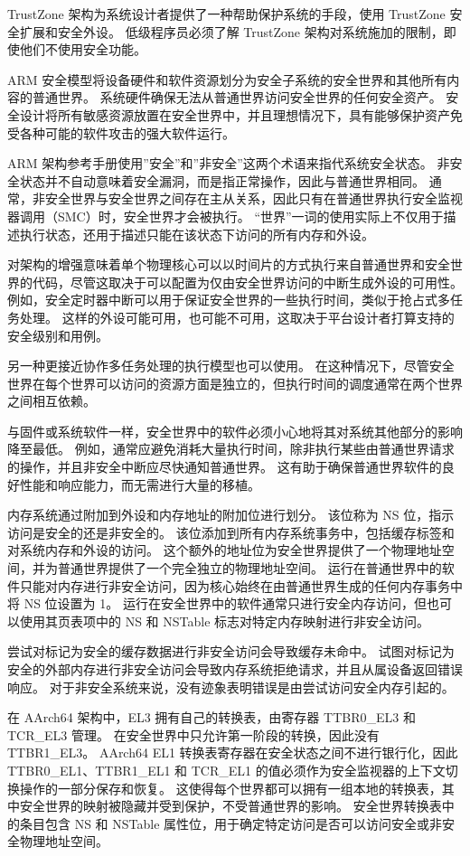 TrustZone 架构为系统设计者提供了一种帮助保护系统的手段，使用 TrustZone 安全扩展和安全外设。
低级程序员必须了解 TrustZone 架构对系统施加的限制，即使他们不使用安全功能。

ARM 安全模型将设备硬件和软件资源划分为安全子系统的安全世界和其他所有内容的普通世界。
系统硬件确保无法从普通世界访问安全世界的任何安全资产。
安全设计将所有敏感资源放置在安全世界中，并且理想情况下，具有能够保护资产免受各种可能的软件攻击的强大软件运行。

ARM 架构参考手册使用''安全''和''非安全''这两个术语来指代系统安全状态。
非安全状态并不自动意味着安全漏洞，而是指正常操作，因此与普通世界相同。
通常，非安全世界与安全世界之间存在主从关系，因此只有在普通世界执行安全监视器调用（SMC）时，安全世界才会被执行。
``世界''一词的使用实际上不仅用于描述执行状态，还用于描述只能在该状态下访问的所有内存和外设。

对架构的增强意味着单个物理核心可以以时间片的方式执行来自普通世界和安全世界的代码，尽管这取决于可以配置为仅由安全世界访问的中断生成外设的可用性。
例如，安全定时器中断可以用于保证安全世界的一些执行时间，类似于抢占式多任务处理。
这样的外设可能可用，也可能不可用，这取决于平台设计者打算支持的安全级别和用例。

另一种更接近协作多任务处理的执行模型也可以使用。
在这种情况下，尽管安全世界在每个世界可以访问的资源方面是独立的，但执行时间的调度通常在两个世界之间相互依赖。

与固件或系统软件一样，安全世界中的软件必须小心地将其对系统其他部分的影响降至最低。
例如，通常应避免消耗大量执行时间，除非执行某些由普通世界请求的操作，并且非安全中断应尽快通知普通世界。
这有助于确保普通世界软件的良好性能和响应能力，而无需进行大量的移植。

内存系统通过附加到外设和内存地址的附加位进行划分。
该位称为 NS 位，指示访问是安全的还是非安全的。
该位添加到所有内存系统事务中，包括缓存标签和对系统内存和外设的访问。
这个额外的地址位为安全世界提供了一个物理地址空间，并为普通世界提供了一个完全独立的物理地址空间。
运行在普通世界中的软件只能对内存进行非安全访问，因为核心始终在由普通世界生成的任何内存事务中将 NS 位设置为 1。
运行在安全世界中的软件通常只进行安全内存访问，但也可以使用其页表项中的 NS 和 NSTable 标志对特定内存映射进行非安全访问。

尝试对标记为安全的缓存数据进行非安全访问会导致缓存未命中。
试图对标记为安全的外部内存进行非安全访问会导致内存系统拒绝请求，并且从属设备返回错误响应。
对于非安全系统来说，没有迹象表明错误是由尝试访问安全内存引起的。

在 AArch64 架构中，EL3 拥有自己的转换表，由寄存器 TTBR0\_EL3 和 TCR\_EL3 管理。
在安全世界中只允许第一阶段的转换，因此没有 TTBR1\_EL3。
AArch64 EL1 转换表寄存器在安全状态之间不进行银行化，因此 TTBR0\_EL1、TTBR1\_EL1 和 TCR\_EL1 的值必须作为安全监视器的上下文切换操作的一部分保存和恢复。
这使得每个世界都可以拥有一组本地的转换表，其中安全世界的映射被隐藏并受到保护，不受普通世界的影响。
安全世界转换表中的条目包含 NS 和 NSTable 属性位，用于确定特定访问是否可以访问安全或非安全物理地址空间。

